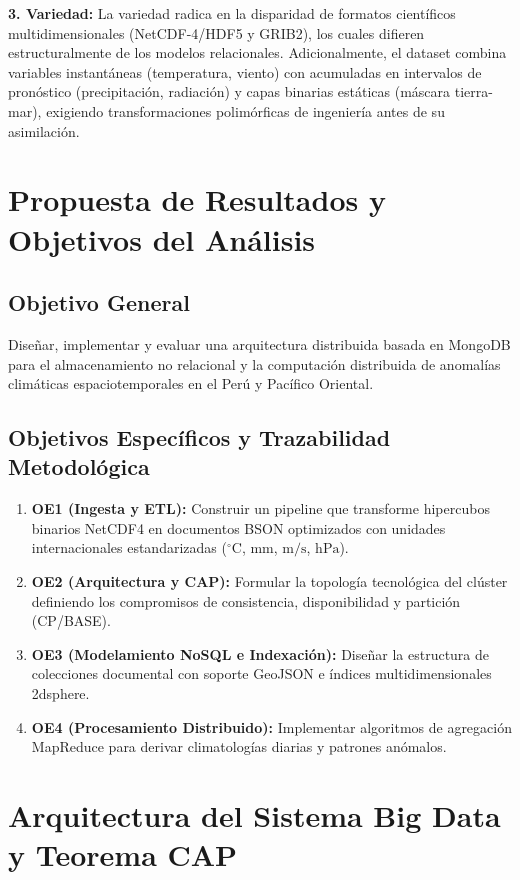 \documentclass[conference]{IEEEtran}
\begin{document}
\textbf{3. Variedad:} La variedad radica en la disparidad de formatos científicos multidimensionales (NetCDF-4/HDF5 y GRIB2), los cuales difieren estructuralmente de los modelos relacionales. Adicionalmente, el dataset combina variables instantáneas (temperatura, viento) con acumuladas en intervalos de pronóstico (precipitación, radiación) y capas binarias estáticas (máscara tierra-mar), exigiendo transformaciones polimórficas de ingeniería antes de su asimilación.

\section{Propuesta de Resultados y Objetivos del Análisis}

\subsection{Objetivo General}
Diseñar, implementar y evaluar una arquitectura distribuida basada en MongoDB para el almacenamiento no relacional y la computación distribuida de anomalías climáticas espaciotemporales en el Perú y Pacífico Oriental.

\subsection{Objetivos Específicos y Trazabilidad Metodológica}
\begin{enumerate}
    \item \textbf{OE1 (Ingesta y ETL):} Construir un pipeline que transforme hipercubos binarios NetCDF4 en documentos BSON optimizados con unidades internacionales estandarizadas ($^\circ\text{C}$, $\text{mm}$, $\text{m/s}$, $\text{hPa}$).
    \item \textbf{OE2 (Arquitectura y CAP):} Formular la topología tecnológica del clúster definiendo los compromisos de consistencia, disponibilidad y partición (CP/BASE).
    \item \textbf{OE3 (Modelamiento NoSQL e Indexación):} Diseñar la estructura de colecciones documental con soporte GeoJSON e índices multidimensionales 2dsphere.
    \item \textbf{OE4 (Procesamiento Distribuido):} Implementar algoritmos de agregación MapReduce para derivar climatologías diarias y patrones anómalos.
\end{enumerate}

\section{Arquitectura del Sistema Big Data y Teorema CAP}
\end{document}
